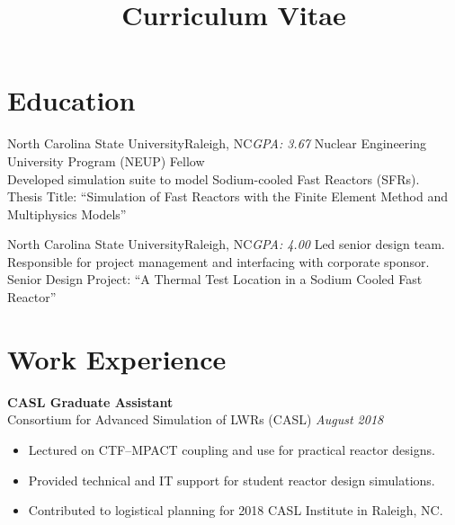 \documentclass[letterpaper,10pt,nocolor,final]{moderncv}
\title{Curriculum Vitae}
\begin{document}
\maketitle


\section{Education}  

    {North Carolina State University}{Raleigh, NC}{\textit{GPA: 3.67}}{
    Nuclear Engineering University Program (NEUP) Fellow \\
    Developed simulation suite to model Sodium-cooled Fast Reactors (SFRs).\\
    Thesis Title: ``Simulation of Fast Reactors with the Finite Element Method and
      Multiphysics Models''}

    {North Carolina State University}{Raleigh, NC}{\textit{GPA: 4.00}}{
    Led senior design team. Responsible for project management and interfacing
      with corporate sponsor. \\
    Senior Design Project: ``A Thermal Test Location in a Sodium Cooled Fast
      Reactor''}

 
\section{Work Experience}

\textbf{CASL Graduate Assistant}\\
Consortium for Advanced Simulation of LWRs (CASL) \hfill \textit{August 2018}
\begin{itemize}
    \item Lectured on CTF--MPACT coupling and use for practical reactor designs.
    \item Provided technical and IT support for student reactor design 
      simulations.
    \item Contributed to logistical planning for 2018 CASL Institute in Raleigh,
      NC.
\end{itemize}
\end{document}
